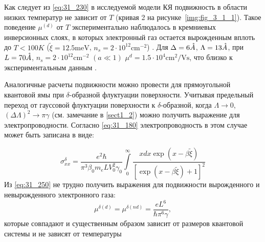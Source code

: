 Как следует из \eqref{eq:31_230} в исследуемой модели КЯ подвижность в области низких температур не зависит от $T$ (кривая 2 на рисунке~\ref{img:fig_3_1_1}). Такое поведение $\mu^{(d)} $ от $T$ экспериментально наблюдалось в кремниевых инверсионных слоях, в которых электронный газ остается вырожденным вплоть до $T<100 K$ ($\tilde{\xi }=12.5 \text{meV}$, $n_{s} =2\cdot 10^{12} \text{cm}^{-2} $) \cite{Stern1980}. Для $\Delta =6\AA$, $\Lambda =13 \AA$, при $L=70 \AA$, $n_{s} =2\cdot 10^{12}  \text{cm}^{-2} $ $(a \ll 1)$ $\mu^d =1.5 \cdot 10^4 \text{cm}^2 /\text{Vs}$, что близко к экспериментальным данным \cite{Stern1980}.

Аналогичные расчеты подвижности можно провести для прямоугольной квантовой ямы при $\delta$-образной флуктуации поверхности. Учитывая предельный переход от гауссовой флуктуации поверхности к $\delta $-образной, когда $\Lambda \to 0$, ${\left(\Delta \Lambda \right)}^2\to \pi \gamma $ (см. замечание в \ref{sect1_2}) можно получить выражение для электропроводности. Согласно \eqref{eq:31_180} электропроводность в этом случае может быть записана в виде:

\begin{equation} \label{eq:31_250}
{\sigma }^{\delta }_{xx}=\frac{e^2\hbar }{{\pi }^3{\beta }_0 m_e L V^2_0 \gamma_0 }\int\limits_0^\infty{\frac{x dx \exp{(x-\beta \widetilde{\xi })}}{{\left[ \exp{(x-\beta \widetilde{\xi })}+1 \right] }^2}}
\end{equation}
Из \eqref{eq:31_250} не трудно получить выражения для подвижности вырожденного и невырожденного электронного газа: 
\begin{equation} \label{eq:31_260}
\mu^{\delta \left(d\right)} = \mu^{\delta \left(n d\right)}=\frac{e L^6}{\hbar {\pi }^6\gamma },
\end{equation}
которые совпадают и существенным образом зависит от размеров квантовой системы и не зависят от температуры

